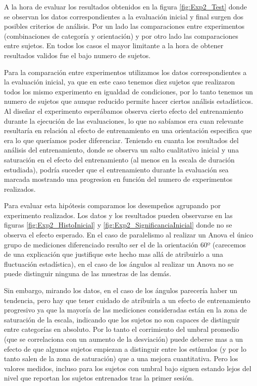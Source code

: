 \documentclass{article}
\begin{document}
    A la hora de evaluar los resultados obtenidos en la figura \ref{fig:Exp2_Test} donde se observan los datos correspondientes a la evaluación inicial y final surgen dos posibles criterios de análisis. Por un lado las comparaciones entre experimentos (combinaciones de categoría y orientación) y por otro lado las comparaciones entre sujetos. En todos los casos el mayor limitante a la hora de obtener resultados validos fue el bajo numero de sujetos. 
    
    Para la comparación entre experimentos utilizamos los datos correspondientes a la evaluación inicial, ya que en este caso tenemos diez sujetos que realizaron todos los mismo experimento en igualdad de condiciones, por lo tanto tenemos un numero de sujetos que aunque reducido permite hacer ciertos análisis estadísticos. Al diseñar el experimento esperábamos observa cierto efecto del entrenamiento durante la ejecución de las evaluaciones, lo que no sabíamos era cuan relevante resultaría en relación al efecto de entrenamiento en una orientación especifica que era lo que queríamos poder diferenciar. Teniendo en cuanta los resultados del análisis del entrenamiento, donde se observa un salto cualitativo inicial y una saturación en el efecto del entrenamiento (al menos en la escala de duración estudiada), podría suceder que el entrenamiento durante la evaluación sea marcada mostrando una progresion en función del numero de experimentos realizados. 
    
    Para evaluar esta hipótesis comparamos los desempeños agrupando por experimento realizados. Los datos y los resultados pueden observarse en las figuras \ref{fig:Exp2_HistoInicial} y \ref{fig:Exp2_SignificanciaInicial} donde no se observa el efecto esperado. En el caso de paralelismo al realizar un Anova el único grupo de mediciones diferenciado resulto ser el de la orientación 60º (carecemos de una explicación que justifique este hecho mas allá de atribuirlo a una fluctuación estadística), en el caso de los ángulos al realizar un Anova no se puede distinguir ninguna de las muestras de las demás. 
    
    Sin embargo, mirando los datos, en el caso de los ángulos parecería haber un tendencia, pero hay que tener cuidado de atribuirla a un efecto de entrenamiento progresivo ya que la mayoría de las mediciones consideradas están en la zona de saturación de la escala, indicando que los sujetos no son capaces de distinguir entre categorías en absoluto. Por lo tanto el corrimiento del umbral promedio (que se correlaciona con un aumento de la desviación) puede deberse mas a un efecto de que algunos sujetos empiezan a distinguir entre los estímulos (y por lo tanto salen de la zona de saturación) que a una mejora cuantitativa. Pero los valores medidos, incluso para los sujetos con umbral bajo siguen estando lejos del nivel que reportan los sujetos entrenados tras la primer sesión. 
    
\end{document}
